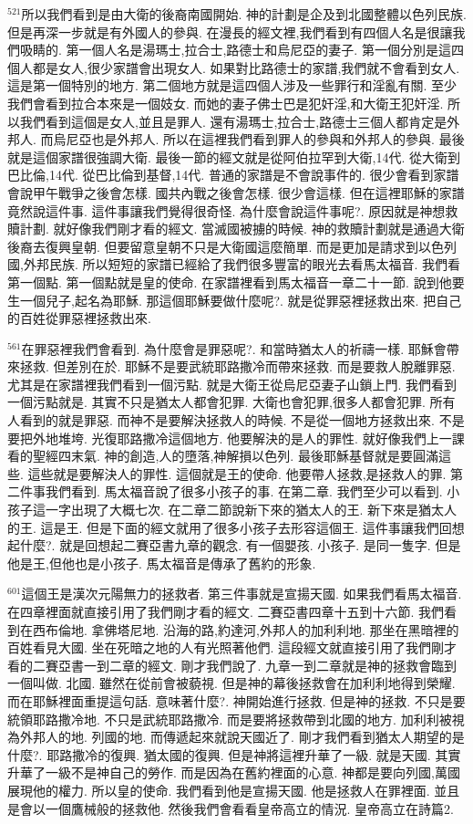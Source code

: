 \documentclass{book}
\begin{document}
$^{521}$所以我們看到是由大衛的後裔南國開始.
神的計劃是企及到北國整體以色列民族.
但是再深一步就是有外國人的參與.
在漫長的經文裡,我們看到有四個人名是很讓我們吸睛的.
第一個人名是湯瑪士,拉合士,路德士和烏尼亞的妻子.
第一個分別是這四個人都是女人,很少家譜會出現女人.
如果對比路德士的家譜,我們就不會看到女人.
這是第一個特別的地方.
第二個地方就是這四個人涉及一些罪行和淫亂有關.
至少我們會看到拉合本來是一個妓女.
而她的妻子佛士巴是犯奸淫,和大衛王犯奸淫.
所以我們看到這個是女人,並且是罪人.
還有湯瑪士,拉合士,路德士三個人都肯定是外邦人.
而烏尼亞也是外邦人.
所以在這裡我們看到罪人的參與和外邦人的參與.
最後就是這個家譜很強調大衛.
最後一節的經文就是從阿伯拉罕到大衛,14代.
從大衛到巴比倫,14代.
從巴比倫到基督,14代.
普通的家譜是不會說事件的.
很少會看到家譜會說甲午戰爭之後會怎樣.
國共內戰之後會怎樣.
很少會這樣.
但在這裡耶穌的家譜竟然說這件事.
這件事讓我們覺得很奇怪.
為什麼會說這件事呢?.
原因就是神想救贖計劃.
就好像我們剛才看的經文.
當滅國被擄的時候.
神的救贖計劃就是通過大衛後裔去復興皇朝.
但要留意皇朝不只是大衛國這麼簡單.
而是更加是請求到以色列國,外邦民族.
所以短短的家譜已經給了我們很多豐富的眼光去看馬太福音.
我們看第一個點.
第一個點就是皇的使命.
在家譜裡看到馬太福音一章二十一節.
說到他要生一個兒子,起名為耶穌.
那這個耶穌要做什麼呢?.
就是從罪惡裡拯救出來.
把自己的百姓從罪惡裡拯救出來.

$^{561}$在罪惡裡我們會看到.
為什麼會是罪惡呢?.
和當時猶太人的祈禱一樣.
耶穌會帶來拯救.
但差別在於.
耶穌不是要武統耶路撒冷而帶來拯救.
而是要救人脫離罪惡.
尤其是在家譜裡我們看到一個污點.
就是大衛王從烏尼亞妻子山鎖上門.
我們看到一個污點就是.
其實不只是猶太人都會犯罪.
大衛也會犯罪,很多人都會犯罪.
所有人看到的就是罪惡.
而神不是要解決拯救人的時候.
不是從一個地方拯救出來.
不是要把外地堆垮.
光復耶路撒冷這個地方.
他要解決的是人的罪性.
就好像我們上一課看的聖經四末氣.
神的創造,人的墮落,神解損以色列.
最後耶穌基督就是要圓滿這些.
這些就是要解決人的罪性.
這個就是王的使命.
他要帶人拯救,是拯救人的罪.
第二件事我們看到.
馬太福音說了很多小孩子的事.
在第二章.
我們至少可以看到.
小孩子這一字出現了大概七次.
在二章二節說新下來的猶太人的王.
新下來是猶太人的王.
這是王.
但是下面的經文就用了很多小孩子去形容這個王.
這件事讓我們回想起什麼?.
就是回想起二賽亞書九章的觀念.
有一個嬰孩.
小孩子.
是同一隻字.
但是他是王,但他也是小孩子.
馬太福音是傳承了舊約的形象.

$^{601}$這個王是漢次元陽無力的拯救者.
第三件事就是宣揚天國.
如果我們看馬太福音.
在四章裡面就直接引用了我們剛才看的經文.
二賽亞書四章十五到十六節.
我們看到在西布倫地.
拿佛塔尼地.
沿海的路,約達河,外邦人的加利利地.
那坐在黑暗裡的百姓看見大國.
坐在死暗之地的人有光照著他們.
這段經文就直接引用了我們剛才看的二賽亞書一到二章的經文.
剛才我們說了.
九章一到二章就是神的拯救會臨到一個叫做.
北國.
雖然在從前會被藐視.
但是神的幕後拯救會在加利利地得到榮耀.
而在耶穌裡面重提這句話.
意味著什麼?.
神開始進行拯救.
但是神的拯救.
不只是要統領耶路撒冷地.
不只是武統耶路撒冷.
而是要將拯救帶到北國的地方.
加利利被視為外邦人的地.
列國的地.
而傳遞起來就說天國近了.
剛才我們看到猶太人期望的是什麼?.
耶路撒冷的復興.
猶太國的復興.
但是神將這裡升華了一級.
就是天國.
其實升華了一級不是神自己的勞作.
而是因為在舊約裡面的心意.
神都是要向列國,萬國展現他的權力.
所以皇的使命.
我們看到他是宣揚天國.
他是拯救人在罪裡面.
並且是會以一個鷹械般的拯救他.
然後我們會看看皇帝高立的情況.
皇帝高立在詩篇2.
\end{document}
